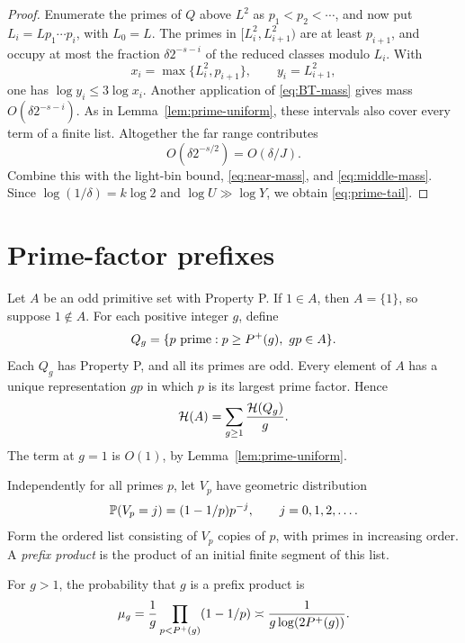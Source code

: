 \begin{proof}
Enumerate the primes of \(Q\) above \(L^2\) as
\(p_1<p_2<\cdots\), and now put \(L_i=Lp_1\cdots p_i\),
with \(L_0=L\). The primes in \([L_i^2,L_{i+1}^2)\) are
at least \(p_{i+1}\), and occupy at most the fraction
\(\delta2^{-s-i}\) of the reduced classes modulo \(L_i\).
With
\[
 x_i=\max\{L_i^2,p_{i+1}\},\qquad y_i=L_{i+1}^2,
\]
one has \(\log y_i\le3\log x_i\). Another application
of \eqref{eq:BT-mass} gives mass \(O(\delta2^{-s-i})\).
As in Lemma~\ref{lem:prime-uniform}, these intervals also
cover every term of a finite list. Altogether the far
range contributes
\[
 O(\delta2^{-s/2})=O(\delta/J).
\]
Combine this with the light-bin bound, \eqref{eq:near-mass},
and \eqref{eq:middle-mass}. Since
\(\log(1/\delta)=k\log2\) and \(\log U\gg\log Y\),
we obtain \eqref{eq:prime-tail}.
\end{proof}

\section{Prime-factor prefixes}\label{sec:prefixes}

Let \(A\) be an odd primitive set with Property P.
If \(1\in A\), then \(A=\{1\}\), so suppose \(1\notin A\).
For each positive integer \(g\), define
\[
 Q_g=\{p\text{ prime}:p\ge\Pmax(g),\ gp\in A\}.
\]
Each \(Q_g\) has Property P, and all its primes are odd.
Every element of \(A\) has a unique representation \(gp\)
in which \(p\) is its largest prime factor. Hence
\begin{equation}\label{eq:fibre-decomposition}
 \mathcal H(A)=\sum_{g\ge1}\frac{\mathcal H(Q_g)}g.
\end{equation}
The term at \(g=1\) is \(O(1)\), by
Lemma~\ref{lem:prime-uniform}.

Independently for all primes \(p\), let \(V_p\) have
geometric distribution
\[
 \mathbb P(V_p=j)=(1-1/p)p^{-j},\qquad j=0,1,2,\ldots.
\]
Form the ordered list consisting of \(V_p\) copies of \(p\),
with primes in increasing order. A \emph{prefix product}
is the product of an initial finite segment of this list.

\begin{lemma}\label{lem:prefix-probability}
For \(g>1\), the probability that \(g\) is a prefix product is
\begin{equation}\label{eq:prefix-probability}
 \mu_g=\frac1g\prod_{p<P^{+}(g)}(1-1/p)
           \asymp\frac1{g\log(2P^{+}(g))}.
\end{equation}
\end{lemma}


